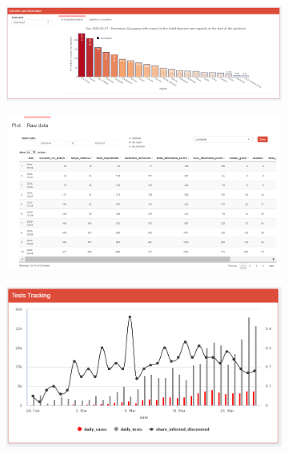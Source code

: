 \documentclass[
12pt, %
a4paper, %
oneside, %
headinclude,footinclude, %
BCOR5mm, %
]{scrartcl}
\begin{document}
\begin{figure}[H]
\begin{subfigure}{.5\textwidth}
  \centering
  \includegraphics[width=1\linewidth]{Figures/Inspection_perc_occupancy.png}
  \caption{}
  \label{fig:Inspection_perc_occupancy}
\end{subfigure} 
\begin{subfigure}{.5\textwidth}
  \centering
  \includegraphics[width=1\linewidth]{Figures/Inspection_rawdata.png} 
  \caption{}
  \label{fig:Inspection_rawdata}
\end{subfigure} 
\begin{subfigure}{.5\textwidth}
  \centering
  \includegraphics[width=1\linewidth]{Figures/Inspection_test_tracking.png} 

\end{subfigure}
\end{figure}
\end{document}
